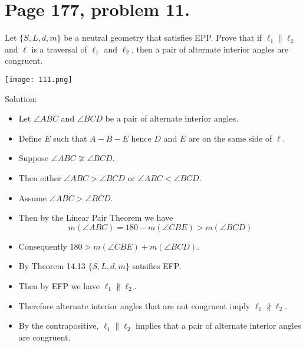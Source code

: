 \documentclass[12pt,openany]{report}
\begin{document}
\newpage

\section*{Page 177, problem 11.}

Let $\{S,L,d,m\}$ be a neutral geometry that satisfies EPP.
Prove that if $\ell_1\|\ell_2$ and $\ell$ is a traversal of $\ell_1$ and $\ell_2$,
then a pair of alternate interior angles are congruent.

\bigskip
\noindent
\texttt{[image: 111.png]}

\bigskip
\noindent
Solution:

\begin{itemize}

\item[]
Let $\angle ABC$ and $\angle BCD$ be a pair of alternate interior angles.
\item[]
Define $E$ such that $A{-}B{-}E$ hence $D$ and $E$ are on the same side of $\ell$.

\item[]
Suppose $\angle ABC\not\cong\angle BCD$.

\item[]
Then either $\angle ABC>\angle BCD$ or $\angle ABC<\angle BCD$.

\item[]
Assume $\angle ABC>\angle BCD$.

\item[]
Then by the Linear Pair Theorem we have
$$m(\angle ABC)=180-m(\angle CBE)>m(\angle BCD)$$

\item[]
Consequently $180>m(\angle CBE)+m(\angle BCD)$.

\item[]
By Theorem 14.13 $\{S,L,d,m\}$ satsifies EFP.

\item[]
Then by EFP we have $\ell_1\not\parallel\ell_2$.

\item[]
Therefore alternate interior angles that are not congruent imply $\ell_1\not\parallel\ell_2$.

\item[]
By the contrapositive, $\ell_1\parallel\ell_2$ implies that a pair of alternate
interior angles are congruent.

\end{itemize}

\newpage
\end{document}
